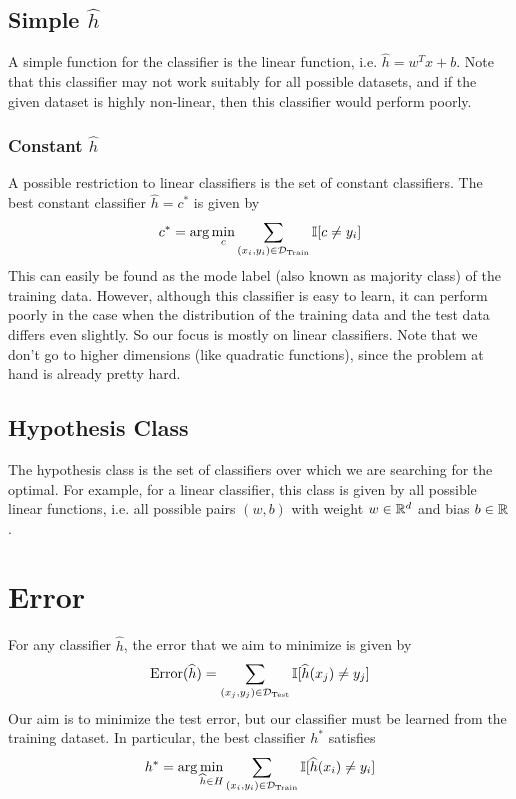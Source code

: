 \documentclass[12pt]{article}
\begin{document}
\subsection{Simple $\widehat{h}$}
A simple function for the classifier is the linear function, i.e. $\widehat{h} = w^Tx+b$. Note that this classifier may not work suitably for all possible datasets, and if the given dataset is highly non-linear, then this classifier would perform poorly.


\subsubsection{Constant $\widehat{h}$}
A possible restriction to linear classifiers is the set of constant classifiers. The best constant classifier $\widehat{h} = c^*$ is given by $$c^* = \arg \min_c \sum_{(x_i,y_i) \in {\cal D}_{\textrm{Train}}} \mathbb{I}[c \neq y_i]$$
This can easily be found as the mode label (also known as majority class) of the training data. However, although this classifier is easy to learn, it can perform poorly in the case when the distribution of the training data and the test data differs even slightly.
\newline \newline
So our focus is mostly on linear classifiers. Note that we don't go to higher dimensions (like quadratic functions), since the problem at hand is already pretty hard.

\subsection{Hypothesis Class}
The hypothesis class is the set of classifiers over which we are searching for the optimal. For example, for a linear classifier, this class is given by all possible linear functions, i.e. all possible pairs $(w,b)$ with weight $w \in \mathbb R^d$ and bias $b \in \mathbb R$.

\section{Error}
For any classifier $\widehat{h}$, the error that we aim to minimize is given by $$\textrm{Error}(\widehat{h}) = \sum_{(x_j,y_j) \in {\cal D}_{\textrm{Test}}} \mathbb{I}[\widehat{h}(x_j) \neq y_j]$$
Our aim is to minimize the test error, but our classifier must be learned from the training dataset. In particular, the best classifier $h^*$ satisfies $$h^* = \arg \min_{\widehat{h} \in H} \sum_{(x_i,y_i) \in {\cal D}_{\textrm{Train}}} \mathbb{I}[\widehat{h}(x_i) \neq y_i]$$
\end{document}
